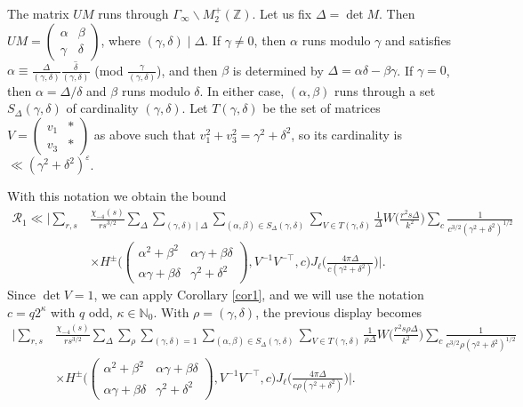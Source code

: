 \documentclass[11pt]{amsart}
\numberwithin{equation}{section}
\theoremstyle{plain}
\theoremstyle{definition}
\numberwithin{equation}{section}
\begin{document}
The matrix $UM$ runs through $\Gamma_{\infty} \backslash M^+_2(\mathbb{Z})$. Let us fix $\Delta = \det M$. Then $UM = (\begin{smallmatrix}\alpha  & \beta\\   \gamma&  \delta\end{smallmatrix})$, where $(\gamma, \delta) \mid \Delta$. If $\gamma \not= 0$, then $\alpha$ runs modulo $\gamma$ and satisfies $\alpha \equiv \frac{\Delta}{(\gamma, \delta)} \overline{\frac{\delta}{(\gamma, \delta)}}$ (mod $\frac{\gamma}{(\gamma, \delta)}$), and then $\beta$ is determined by $\Delta = \alpha \delta - \beta \gamma$. If $\gamma = 0$, then $\alpha = \Delta/\delta$ and $\beta$ runs modulo $\delta$. In either case, $(\alpha, \beta)$ runs through a set $S_{\Delta}(\gamma, \delta)$ of cardinality $(\gamma, \delta)$. Let $T(\gamma, \delta)$ be the set of matrices $V =  \left(\begin{smallmatrix} v_1 & *\\ v_3 &* \end{smallmatrix}\right)$ as above such that $v_1^2 + v_3^2 = \gamma^2 + \delta^2$, so its cardinality is $\ll (\gamma^2 + \delta^2)^{\varepsilon}$. 

With this notation we obtain the bound
\begin{align}
\mathcal{R}_1\ll \Big| \sum_{r, s} &\frac{\chi_{-4}(s)}{rs^{3/2}} \sum_{\Delta}  \sum_{(\gamma, \delta) \mid \Delta} \sum_{(\alpha, \beta) \in S_{\Delta}(\gamma, \delta)}
 \sum_{V \in T(\gamma, \delta)} \frac{1}{\Delta} W\Big( \frac{r^2 s \Delta}{k^2}\Big)   \sum_{c}   \frac{1}{c^{3/2} (\gamma^2 + \delta^2)^{1/2}} \\
 &\times H^{\pm} \Big(\left(\begin{smallmatrix}\alpha^2 + \beta^2& \alpha\gamma + \beta \delta\\ \alpha \gamma + \beta\delta& \gamma^2 + \delta^2 \end{smallmatrix}\right) , V^{-1}V^{-\top}, c\Big) J_{\ell} \Big(\frac{4\pi \Delta }{c(\gamma^2 + \delta^2)}\Big)\Big|. 
 \end{align}
Since $\det V = 1$, we can apply Corollary \ref{cor1}, and we will use the notation $c = q2^{\kappa}$ with $q$ odd, $\kappa \in \mathbb{N}_0$.   With  $\rho = (\gamma, \delta)$, the previous display becomes
\begin{align}
\Big| \sum_{r, s} &\frac{\chi_{-4}(s)}{rs^{3/2}} \sum_{\Delta}\sum_{\rho}  \sum_{(\gamma, \delta)=1} \sum_{(\alpha, \beta) \in S_{\Delta}(\gamma, \delta)}
 \sum_{V \in T(\gamma, \delta)} \frac{1}{\rho\Delta} W\Big( \frac{r^2 s \rho\Delta}{k^2}\Big)   \sum_{c}   \frac{1}{c^{3/2} \rho(\gamma^2 + \delta^2)^{1/2}} \\
 &\times H^{\pm} \Big(\left(\begin{smallmatrix}\alpha^2 + \beta^2& \alpha\gamma + \beta \delta\\ \alpha \gamma + \beta\delta& \gamma^2 + \delta^2 \end{smallmatrix}\right) , V^{-1}V^{-\top}, c\Big) J_{\ell} \Big(\frac{4\pi \Delta }{c\rho(\gamma^2 + \delta^2)}\Big)\Big|. 
 \end{align}
\end{document}
